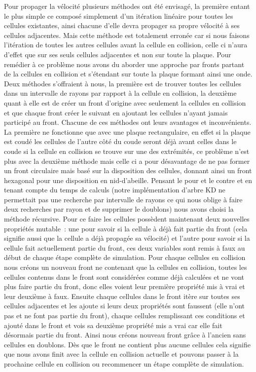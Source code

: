 \documentclass[a4paper,10pt]{article}
\begin{document}
Pour propager la vélocité plusieurs méthodes ont été envisagé, la première entant le plus simple ce composé simplement d'un itération linéaire pour toutes les cellules existantes, ainsi chacune d'elle devra propager sa propre vélocité à ses cellules adjacentes. Mais cette méthode est totalement erronée car si nous faisons l'itération de toutes les autres cellules avant la cellule en collision, celle ci n'aura d'effet que sur ses seuls cellules adjacentes et non sur toute la plaque. Pour remédier à ce problème nous avons du aborder une approche par fronts partant de la cellules en collision et s'étendant sur toute la plaque formant ainsi une onde. Deux méthodes s'offraient à nous, la première est de trouver toutes les cellules dans un intervalle de rayons par rapport à la cellule en collision, la deuxième quant à elle est de créer un front d'origine avec seulement la cellules en collision et que chaque front créer le suivant en ajoutant les cellules n'ayant jamais participé au front. Chacune de ces méthodes ont leurs avantages et inconvénients. La première ne fonctionne que avec une plaque rectangulaire, en effet si la plaque est coudé les cellules de l'autre côté du coude seront déjà avant celles dans le coude si la cellule en collision se trouve sur une des extrémités, ce problème n'est plus avec la deuxième méthode mais celle ci a pour désavantage de ne pas former un front circulaire mais basé sur la disposition des cellules, donnant ainsi un front hexagonal pour une disposition en nid-d'abeille. Pensant le pour et le contre et en tenant compte du temps de calculs (notre implémentation d'arbre KD ne permettait pas une recherche par intervalle de rayons ce qui nous oblige à faire deux recherches par rayon et de supprimer le doublons) nous avons choisi la méthode récursive.
Pour ce faire les cellules possèdent maintenant deux nouvelles propriétés mutable~: une pour savoir si la cellule à déjà fait partie du front (cela signifie aussi que la cellule a déjà propagée sa vélocité) et l'autre pour savoir si la cellule fait actuellement partie du front, ces deux variables sont remis à faux au début de chaque étape complète de simulation. Pour chaque cellules en collision nous créons un nouveau front ne contenant que la cellules en collision, toutes les cellules contenus dans le front sont considérées comme déjà calculées et ne vont plus faire partie du front, donc elles voient leur première propriété mis à vrai et leur deuxième à faux. Ensuite chaque cellules dans le front itère sur toutes ses cellules adjacentes et les ajoute si leurs deux propriétés sont faussent (elle n'ont pas et ne font pas partie du front), chaque cellules remplissant ces conditions et ajouté dans le front et vois sa deuxième propriété mis a vrai car elle fait désormais partie du front. Ainsi nous créons nouveau front grâce à l'ancien sans cellules en doublons. Dès que le front ne contient plus aucune cellules cela signifie que nous avons finit avec la cellule en collision actuelle et pouvons passer à la prochaine cellule en collision ou recommencer un étape complète de simulation.
\end{document}
